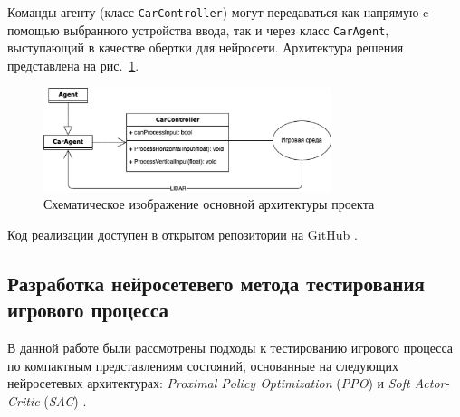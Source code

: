 Команды агенту (класс \verb|CarController|) могут передаваться как напрямую c помощью выбранного устройства ввода, так и через класс \verb|CarAgent|, выступающий в качестве обертки для нейросети. Архитектура решения представлена на рис.~\ref{fig:diagram}.

\begin{figure}
	\centering
	\includegraphics[width=0.75\textwidth]{images/diagram.drawio.eps}
	\caption{Схематическое изображение основной архитектуры проекта}
	\label{fig:diagram}
\end{figure}

Код реализации доступен в открытом репозитории на GitHub \cite{ratm}.

\subsection{Разработка нейросетевего метода тестирования игрового процесса}
В данной работе были рассмотрены подходы к тестированию игрового процесса по компактным представлениям состояний, основанные на следующих нейросетевых архитектурах: \textit{Proximal Policy Optimization} (\textit{PPO}) \cite{ppo} и \textit{Soft Actor-Critic} (\textit{SAC}) \cite{sac}.

